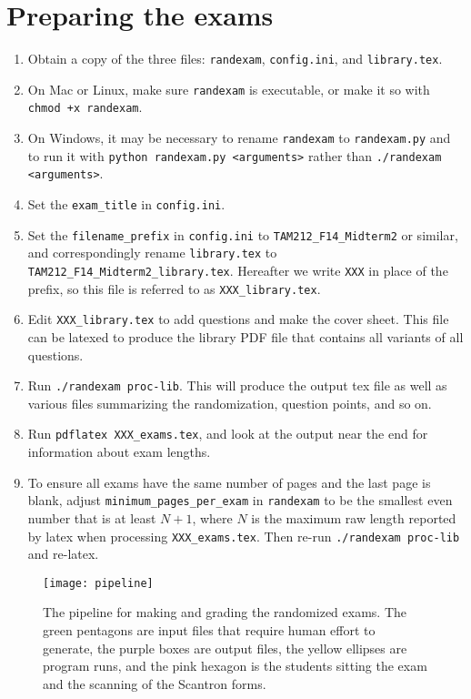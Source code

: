 \documentclass{article}
\begin{document}
\section{Preparing the exams}

\begin{enumerate}
\item Obtain a copy of the three files: \texttt{randexam},
  \texttt{config.ini}, and \texttt{library.tex}.
\item On Mac or Linux, make sure \texttt{randexam} is executable, or
  make it so with \texttt{chmod +x randexam}.
\item On Windows, it may be necessary to rename \texttt{randexam} to
  \texttt{randexam.py} and to run it with \texttt{python randexam.py
    <arguments>} rather than \texttt{./randexam <arguments>}.
\item Set the \texttt{exam_title} in \texttt{config.ini}.
\item Set the \texttt{filename_prefix} in \texttt{config.ini} to
  \texttt{TAM212_F14_Midterm2} or similar, and correspondingly rename
  \texttt{library.tex} to
  \texttt{TAM212_F14_Midterm2_library.tex}. Hereafter we write
  \texttt{XXX} in place of the prefix, so this file is referred to as
  \texttt{XXX_library.tex}.
\item Edit \texttt{XXX_library.tex} to add questions and make the
  cover sheet. This file can be latexed to produce the library PDF
  file that contains all variants of all questions.
\item Run \texttt{./randexam proc-lib}. This will produce the output
  tex file as well as various files summarizing the randomization,
  question points, and so on.
\item Run \texttt{pdflatex XXX_exams.tex}, and look at the output near
  the end for information about exam lengths.
\item To ensure all exams have the same number of pages and the last
  page is blank, adjust \texttt{minimum_pages_per_exam} in
  \texttt{randexam} to be the smallest even number that is at least $N
  + 1$, where $N$ is the maximum raw length reported by latex when
  processing \texttt{XXX_exams.tex}. Then re-run \texttt{./randexam
    proc-lib} and re-latex.
\end{enumerate}

\begin{figure}
  \centering
  \texttt{[image: pipeline]}
  \caption{The pipeline for making and grading the randomized
    exams. The green pentagons are input files that require human
    effort to generate, the purple boxes are output files, the yellow
    ellipses are program runs, and the pink hexagon is the students
    sitting the exam and the scanning of the Scantron forms.}
  \label{fig:pipeline}
\end{figure}
\end{document}
